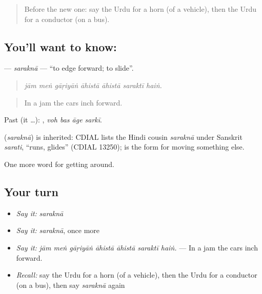 \begin{quote}
Before the new one: say the Urdu for a horn (of a vehicle), then the Urdu for a conductor (on a bus).
\end{quote}

\subsection*{You'll want to know: }
\textbf{} — \emph{saraknā} — \textquotedblleft{}to edge forward; to slide\textquotedblright{}.

\begin{quote}
      
\end{quote}

\begin{quote}
\emph{jām meṅ gāṛiyāṅ āhistā āhistā saraktī haiṅ.}
\end{quote}

\begin{quote}
In a jam the cars inch forward.
\end{quote}

Past (it …):    , \emph{voh bas āge sarkī}.

\begin{cousinweb}
\textbf{} (\emph{saraknā}) is inherited: CDIAL lists the Hindi cousin \emph{saraknā} under Sanskrit \emph{sarati}, \textquotedblleft{}runs, glides\textquotedblright{} (CDIAL 13250); \textbf{} is the form for moving something else.
\end{cousinweb}

\begin{grammarlens}[title={What you've built}]
One more word for getting around.
\end{grammarlens}

\subsection*{Your turn}
\begin{itemize}
\raggedright
  \item \emph{Say it:} \emph{saraknā}
  \item \emph{Say it:} \emph{saraknā}, once more
  \item \emph{Say it:} \emph{jām meṅ gāṛiyāṅ āhistā āhistā saraktī haiṅ.} — In a jam the cars inch forward.
  \item \emph{Recall:} say the Urdu for a horn (of a vehicle), then the Urdu for a conductor (on a bus), then say \emph{saraknā} again
\end{itemize}

